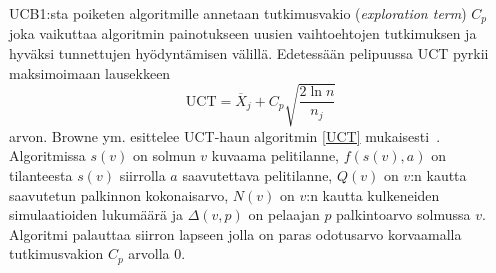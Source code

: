 \documentclass[12pt,finnish]{tktltiki2}
\theoremstyle{definition}
\theoremstyle{remark}
\begin{document}
UCB1:sta poiketen algoritmille annetaan tutkimusvakio (\textit{exploration term}) $C_p$ joka vaikuttaa algoritmin painotukseen uusien vaihtoehtojen tutkimuksen ja hyväksi tunnettujen hyödyntämisen välillä. Edetessään pelipuussa UCT pyrkii maksimoimaan lausekkeen
\begin{equation}
\text{UCT} = \overline{X}_j + C_p \sqrt{\frac{2 \ln n}{n_j}}
\end{equation}
arvon. Browne ym. esittelee UCT-haun algoritmin \ref{UCT} mukaisesti~\cite{browne}. Algoritmissa $s(v)$ on solmun $v$ kuvaama pelitilanne, $f(s(v), a)$ on tilanteesta $s(v)$ siirrolla $a$ saavutettava pelitilanne, $Q(v)$ on $v$:n kautta saavutetun palkinnon kokonaisarvo, $N(v)$ on $v$:n kautta kulkeneiden simulaatioiden lukumäärä ja $\Delta(v, p)$ on pelaajan $p$ palkintoarvo solmussa $v$. Algoritmi palauttaa siirron lapseen jolla on paras odotusarvo korvaamalla tutkimusvakion $C_p$ arvolla $0$.
\end{document}

